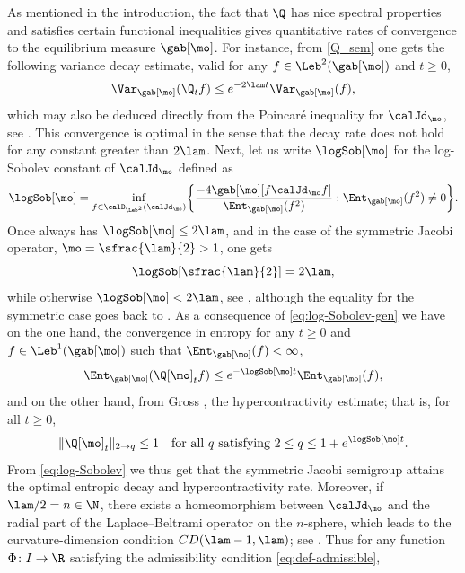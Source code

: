 \begin{appendix}
As mentioned in the introduction, the fact that $\Q$ has nice spectral properties and satisfies certain functional inequalities gives quantitative rates of convergence to the equilibrium measure $\gab[\mo]$. For instance, from \eqref{Q_sem} one gets the following variance decay estimate, valid for any $f \in \Leb^2(\gab[\mo])$ and $t \geq 0$,
\begin{equation*}
\Var_{\gab[\mo]}(\Q_t f ) \leq e^{-2\lam t} \Var_{\gab[\mo]}(f),
\end{equation*}
which may also be deduced directly from the Poincaré inequality for $\calJd_\mo$, see \cite[Chap.\,4.2]{Bakry_Book}. This convergence is optimal in the sense that the decay rate does not hold for any constant greater than $2\lam$. Next, let us write $\logSob[\mo]$ for the log-Sobolev constant of $\calJd_\mo$ defined as
\begin{equation}
\label{eq:log-Sobolev-gen}
\logSob[\mo] = \inf_{f \in \calD_{\Leb^2}(\calJd_\mo)} \biggl\{ \frac{-4\gab[\mo] [f \calJd_\mo f]}{\Ent_{\gab[\mo]} (f^2)} :\Ent_{\gab[\mo]} (f^2) \neq 0 \biggr\}.
\end{equation}
Once always has $\logSob[\mo] \leq 2\lam$, and in the case of the symmetric Jacobi operator, \ie
$\mo = \sfrac{\lam}{2} > 1$, one gets
\begin{equation}
\label{eq:log-Sobolev}
\logSob[\sfrac{\lam}{2}] = 2\lam,
\end{equation}
while otherwise $\logSob[\mo] < 2\lam$, see \eg \cite{fontenas:1998}, although the equality for the symmetric case goes back to \cite{pearson:1992}. As a consequence of \eqref{eq:log-Sobolev-gen} we have on the one hand, the convergence in entropy for any $t \geq 0$ and $f \in \Leb^1(\gab[\mo])$ such that $\Ent_{\gab[\mo]}(f) < \infty$,
\begin{equation*}
\Ent_{\gab[\mo]} (\Q[\mo]_tf) \leq e^{-\logSob[\mo] t} \Ent_{\gab[\mo]} (f),
\end{equation*}
and on the other hand, from Gross \cite{Gross}, the hypercontractivity estimate; that is, for all $t\geq 0$,
\begin{equation*}
\|\Q[\mo]_t\|_{2 \to q} \leq 1\quad \textrm{for all $q$ satisfying } 2\leq q \leq 1+e^{ \logSob[\mo] t}.
\end{equation*}
From \eqref{eq:log-Sobolev} we thus get that the symmetric Jacobi semigroup attains the optimal entropic decay and hypercontractivity rate. Moreover, if $\lam/2 = n \in \N$, there exists a homeomorphism between $\calJd_\mo$ and the radial part of the Laplace--Beltrami operator on the $n$-sphere, which leads to the curvature-dimension condition $CD(\lam-1,\lam)$; see \cite{Bakry_Book}. Thus for any function $\Phi \colon I \to \R$ satisfying the admissibility condition \eqref{eq:def-admissible},

\end{appendix}
